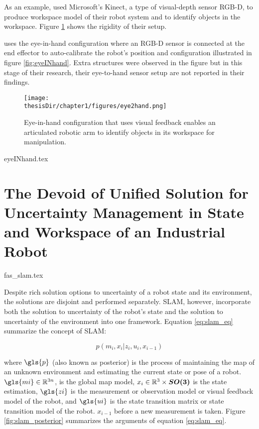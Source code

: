 As an example, \textcite{Luo2016}
used Microsoft's Kinect, 
a type of visual-depth sensor \acrfull{RGB-D}, 
to produce workspace
model of their robot system and to identify objects 
in the workspace. Figure \ref{fig:eye2hand} shows the rigidity
of their setup.

\textcite{Klingensmith2016} uses the eye-in-hand configuration
where an RGB-D sensor is connected at the end effector to
auto-calibrate the robot's position and configuration
illustrated in figure \ref{fig:eyeINhand}. Extra structures
were observed in the figure but in this stage of their research, 
their eye-to-hand sensor setup are not reported in their findings. 

\begin{figure}
  \centering
  \texttt{[image: \\thesisDir/chapter1/figures/eye2hand.png]}
  \caption{Eye-in-hand configuration that uses visual feedback enables an articulated robotic
arm to identify objects in its workspace for manipulation.}
  \label{fig:eye2hand}
\end{figure}

{eyeINhand.tex}
\section{The Devoid of Unified Solution for 
Uncertainty Management in State and Workspace of an Industrial Robot}
\label{sec:ununified_sol}
{fas_slam.tex}

Despite rich solution options to uncertainty of a robot state and its environment, the solutions are disjoint
and performed separately. SLAM, however,
incorporate both the solution to uncertainty of the robot's state and the solution to uncertainty of the
environment into one framework. Equation \ref{eq:slam_eq} summarize the concept of SLAM:

\begin{equation}
  \label{eq:slam_eq}
  p(m_i,x_i|z_i,u_i,x_{i-1})
\end{equation}

where $\gls{p}$ (also known as posterior) is the process of maintaining the map of an unknown
environment and estimating the current 
state or pose of a robot. 
$\gls{mi} \in \mathbb{R}^{3n}$, is the global map model, $x_i \in \mathbb{R}^3 \times \vb*{SO(3)}$
is the state estimation, $\gls{zi}$ is the measurement or observation model or visual feedback model of the robot, and 
$ \gls{ui} $ is the state transition matrix or state transition model of the robot. $x_{i-1}$ before a new
measurement is taken. Figure \ref{fig:slam_posterior} summarizes the arguments of equation \ref{eq:slam_eq}.

